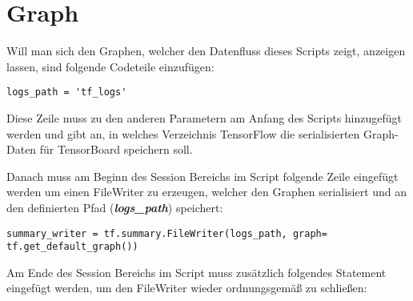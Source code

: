 \section{Graph}

Will man sich den Graphen, welcher den Datenfluss dieses Scripts zeigt, anzeigen lassen, sind folgende Codeteile einzufügen:

\lstset{language=Python}

\begin{lstlisting}
logs_path = 'tf_logs'
\end{lstlisting}


Diese Zeile muss zu den anderen Parametern am Anfang des Scripts hinzugefügt werden und gibt an, in welches Verzeichnis TensorFlow die serialisierten Graph-Daten für TensorBoard speichern soll.

Danach muss am Beginn des Session Bereichs im Script folgende Zeile eingefügt werden um einen FileWriter zu erzeugen, welcher den Graphen serialisiert und an den definierten Pfad (\textbf{\textit{logs\_path}}) speichert:

\lstset{language=Python}

\begin{lstlisting}
summary_writer = tf.summary.FileWriter(logs_path, graph= tf.get_default_graph()) 
\end{lstlisting}


Am Ende des Session Bereichs im Script muss zusätzlich folgendes Statement eingefügt werden, um den FileWriter wieder ordnungsgemäß zu schließen:

\lstset{language=Python}

